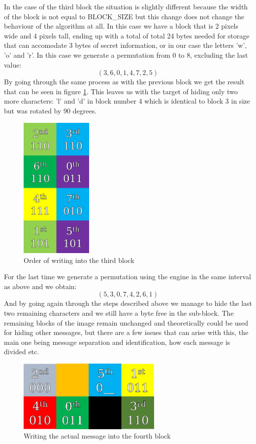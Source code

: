 In the case of the third block the situation is slightly different because the width of the block is not equal to BLOCK\_SIZE but this change does not change the behaviour of the algorithm at all. In this case we have a block that is 2 pixels wide and 4 pixels tall, ending up with a total of total 24 bytes needed for storage that can accomodate 3 bytes of secret information, or in our case the letters 'w', 'o' and 'r'. In this case we generate a permutation from 0 to 8, excluding the last value:
\[(3,6,0,1,4,7,2,5)\]
By going through the same process as with the previous block we get the result that can be seen in figure \ref{scramble_example_third_block}. This leaves us with the target of hiding only two more characters: 'l' and 'd' in block number 4 which is identical to block 3 in size but was rotated by 90 degrees. 

\begin{figure}[H]
    \centering
    \includegraphics[height=7cm,keepaspectratio]{pics/bmp_scrambling/third_block_marked}
    \caption{Order of writing into the third block}
    \label{scramble_example_third_block}
\end{figure}

For the last time we generate a permutation using the engine in the same interval as above and we obtain:
\[(5,3,0,7,4,2,6,1)\]
And by going again through the steps described above we manage to hide the last two remaining characters and we still have a byte free in the sub-block. The remaining blocks of the image remain unchanged and theoretically could be used for hiding other messages, but there are a few issues that can arise with this, the main one being message separation and identification, how each message is divided etc.

\begin{figure}[H]
    \centering
    \includegraphics[width=7cm,keepaspectratio]{pics/bmp_scrambling/fourth_block_marked}
    \caption{Writing the actual message into the fourth block}
\end{figure}

